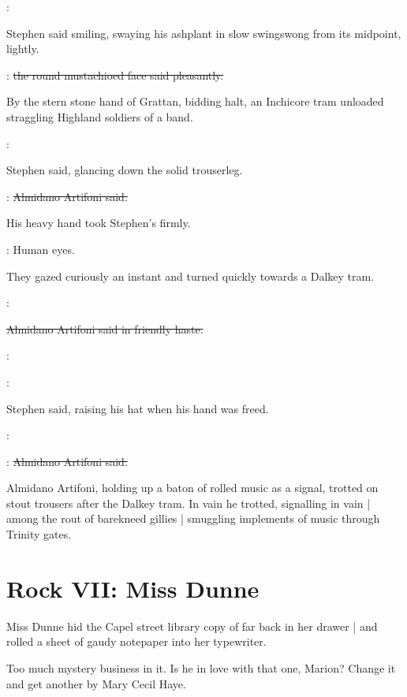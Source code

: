 \Stephen:

Stephen said smiling,
swaying his ashplant in slow swingswong from its midpoint,
lightly.

\artifoni:
\sout{the round mustachioed face said pleasantly.}

By the stern stone hand of Grattan,
bidding halt,
an Inchicore tram unloaded straggling Highland soldiers of a band.

\Stephen:

Stephen said,
glancing down the solid trouserleg.

\artifoni:
\sout{Almidano Artifoni said.}

His heavy hand took Stephen's firmly.

\StephenInt:
Human eyes.

They gazed curiously an instant and turned quickly towards a Dalkey tram.

\artifoni:

\sout{Almidano Artifoni said in friendly haste.}

\artifoni:

\Stephen:

Stephen said,
raising his hat when his hand was freed.

\Stephen:

\artifoni:
\sout{Almidano Artifoni said.}

Almidano Artifoni,
holding up a baton of rolled music as a signal,
trotted on stout trousers after the Dalkey tram.
In vain he trotted,
signalling in vain |
among the rout of barekneed gillies |
smuggling implements of music through Trinity gates.


\section*{Rock VII: Miss Dunne}


Miss Dunne hid the Capel street library copy
of  far back in her drawer |
and rolled a sheet of gaudy notepaper into her typewriter.%

Too much mystery business in it.
Is he in love with that one, Marion?
Change it and get another by Mary Cecil Haye.

